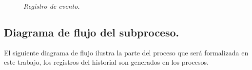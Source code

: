 \documentclass[12pt,a4paper]{article}
\begin{document}
\begin{figure}[h]
\centering
{}
\caption{\textit{Registro de evento.}} \label{fig:M1}
\end{figure}

\subsection{Diagrama de flujo del subproceso.}
El siguiente diagrama de flujo ilustra la parte del proceso que será formalizada en este trabajo, los registros del historial son generados en los procesos.
\end{document}
